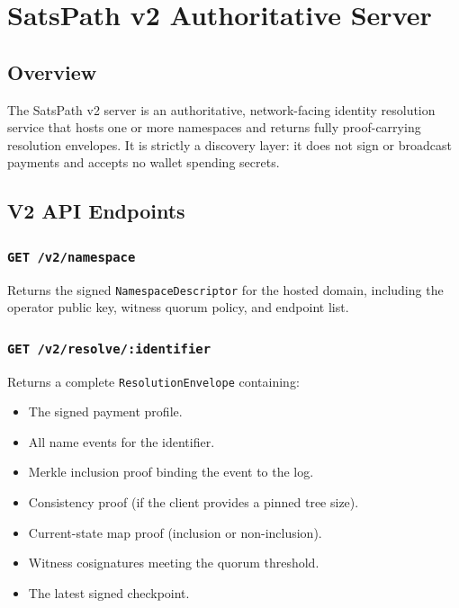 \documentclass[
]{article}
\author{}
\date{}
\providecommand{\tightlist}{%
  \setlength{\itemsep}{0pt}\setlength{\parskip}{0pt}}
\begin{document}
\hypertarget{satspath-v2-authoritative-server}{%
\section{SatsPath v2 Authoritative
Server}\label{satspath-v2-authoritative-server}}

\hypertarget{overview}{%
\subsection{Overview}\label{overview}}

The SatsPath v2 server is an authoritative, network-facing identity
resolution service that hosts one or more namespaces and returns fully
proof-carrying resolution envelopes. It is strictly a discovery layer:
it does not sign or broadcast payments and accepts no wallet spending
secrets.

\hypertarget{v2-api-endpoints}{%
\subsection{V2 API Endpoints}\label{v2-api-endpoints}}

\hypertarget{get-v2namespace}{%
\subsubsection{\texorpdfstring{\texttt{GET\ /v2/namespace}}{GET /v2/namespace}}\label{get-v2namespace}}

Returns the signed \texttt{NamespaceDescriptor} for the hosted domain,
including the operator public key, witness quorum policy, and endpoint
list.

\hypertarget{get-v2resolveidentifier}{%
\subsubsection{\texorpdfstring{\texttt{GET\ /v2/resolve/:identifier}}{GET /v2/resolve/:identifier}}\label{get-v2resolveidentifier}}

Returns a complete \texttt{ResolutionEnvelope} containing:

\begin{itemize}
\tightlist
\item
  The signed payment profile.
\item
  All name events for the identifier.
\item
  Merkle inclusion proof binding the event to the log.
\item
  Consistency proof (if the client provides a pinned tree size).
\item
  Current-state map proof (inclusion or non-inclusion).
\item
  Witness cosignatures meeting the quorum threshold.
\item
  The latest signed checkpoint.
\end{itemize}
\end{document}
